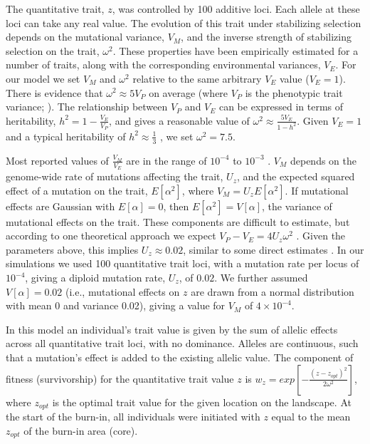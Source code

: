 The quantitative trait, $z$, was controlled by 100 additive loci. Each allele at these loci can take any real value. The evolution of this trait under stabilizing selection depends on the mutational variance, $V_M$, and the inverse strength of stabilizing selection on the trait, $\omega^2$. These properties have been empirically estimated for a number of traits, along with the corresponding environmental variances, $V_E$. For our model we set $V_M$ and $\omega^2$ relative to the same arbitrary $V_E$ value ($V_E = 1$). There is evidence that $\omega^2 \approx 5 V_P$ on average (where $V_P$ is the phenotypic trait variance; \citet{Kingsolver:2001, Johnson:2005}). The relationship between $V_P$ and $V_E$ can be expressed in terms of heritability, $h^2 = 1 - \frac{V_E}{V_P}$, and gives a reasonable value of $\omega^2 \approx \frac{5V_E}{1 - h^2}$. Given $V_E = 1$ and a typical heritability of $h^2 \approx \frac{1}{3}$ \citep{Mousseau:1987, Houle:1992}, we set $\omega^2 = 7.5$.  

Most reported values of $\frac{V_M}{V_E}$ are in the range of $10^{-4}$ to $10^{-3}$ \citep{Houle:1996}. $V_M$ depends on the genome-wide rate of mutations affecting the trait, $U_z$, and the expected squared effect of a mutation on the trait, $E[\alpha^2]$, where $V_M = U_z E[\alpha^2]$. If mutational effects are Gaussian with $E[\alpha] = 0$, then $E[\alpha^2] = V[\alpha]$, the variance of mutational effects on the trait. These components are difficult to estimate, but according to one theoretical approach we expect $V_P - V_E = 4 U_z \omega^2$ \citep{Turelli:1984, Charlesworth:2010}. Given the parameters above, this implies $U_z \approx 0.02$, similar to some direct estimates \citep{Lynch:1998}. In our simulations we used 100 quantitative trait loci, with a mutation rate per locus of $10^{-4}$, giving a diploid mutation rate, $U_z$, of $0.02$. We further assumed $V[\alpha] = 0.02$ (i.e., mutational effects on $z$ are drawn from a normal distribution with mean 0 and variance 0.02), giving a value for $V_M$ of $4\times10^{-4}$.

In this model an individual's trait value is given by the sum of allelic effects across all quantitative trait loci, with no dominance. Alleles are continuous, such that a mutation's effect is added to the existing allelic value. The component of fitness (survivorship) for the quantitative trait value $z$ is $w_z = exp[-\frac{(z-z_{opt})^2}{2\omega^2}]$, where $z_{opt}$ is the optimal trait value for the given location on the landscape. At the start of the burn-in, all individuals were initiated with $z$ equal to the mean $z_{opt}$ of the burn-in area (core). 

